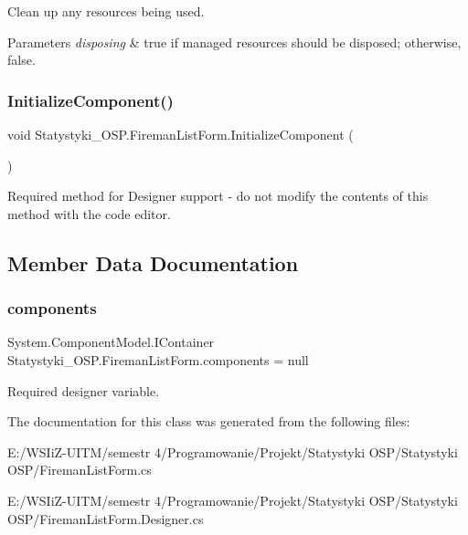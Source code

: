 Clean up any resources being used. 


\begin{DoxyParams}{Parameters}
{\em disposing} & true if managed resources should be disposed; otherwise, false.\\
\hline
\end{DoxyParams}
\mbox{\label{class_statystyki___o_s_p_1_1_fireman_list_form_a2662e79b9ff427db680ff2340bacd1e0}} 
\subsubsection{\texorpdfstring{InitializeComponent()}{InitializeComponent()}}
{\footnotesize\ttfamily void Statystyki\+\_\+\+O\+S\+P.\+Fireman\+List\+Form.\+Initialize\+Component (\begin{DoxyParamCaption}{ }\end{DoxyParamCaption})\hspace{0.3cm}{\ttfamily [private]}}



Required method for Designer support -\/ do not modify the contents of this method with the code editor. 



\subsection{Member Data Documentation}
\mbox{\label{class_statystyki___o_s_p_1_1_fireman_list_form_aa543afa3e418462460450e4efa38e36b}} 
\subsubsection{\texorpdfstring{components}{components}}
{\footnotesize\ttfamily System.\+Component\+Model.\+I\+Container Statystyki\+\_\+\+O\+S\+P.\+Fireman\+List\+Form.\+components = null\hspace{0.3cm}{\ttfamily [private]}}



Required designer variable. 



The documentation for this class was generated from the following files\+:\begin{DoxyCompactItemize}
\item 
E\+:/\+W\+S\+Ii\+Z-\/\+U\+I\+T\+M/semestr 4/\+Programowanie/\+Projekt/\+Statystyki O\+S\+P/\+Statystyki O\+S\+P/Fireman\+List\+Form.\+cs\item 
E\+:/\+W\+S\+Ii\+Z-\/\+U\+I\+T\+M/semestr 4/\+Programowanie/\+Projekt/\+Statystyki O\+S\+P/\+Statystyki O\+S\+P/Fireman\+List\+Form.\+Designer.\+cs\end{DoxyCompactItemize}
